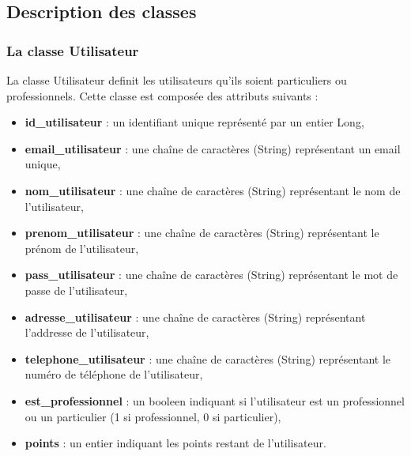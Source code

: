 \documentclass{article}
\begin{document}
\subsection{Description des classes}
\subsubsection{La classe Utilisateur}
La classe Utilisateur definit les utilisateurs qu'ils soient particuliers ou professionnels. Cette classe est composée des attributs suivants :
\begin{itemize}
\item \textbf{id\_utilisateur} : un identifiant unique représenté par un entier Long,
\item \textbf{email\_utilisateur} : une chaîne de caractères (String) représentant un email unique,
\item \textbf{nom\_utilisateur} : une chaîne de caractères (String) représentant le nom de l'utilisateur,
\item \textbf{prenom\_utilisateur} : une chaîne de caractères (String) représentant le prénom de l'utilisateur,
\item \textbf{pass\_utilisateur} : une chaîne de caractères (String) représentant le mot de passe de l'utilisateur,
\item \textbf{adresse\_utilisateur} : une chaîne de caractères (String) représentant l'addresse de l'utilisateur,
\item \textbf{telephone\_utilisateur} : une chaîne de caractères (String) représentant le numéro de téléphone de l'utilisateur,
\item \textbf{est\_professionnel} : un booleen indiquant si l'utilisateur est un professionnel ou un particulier (1 si professionnel, 0 si particulier),
\item \textbf{points} : un entier indiquant les points restant de l'utilisateur.
\end{itemize}
\end{document}
